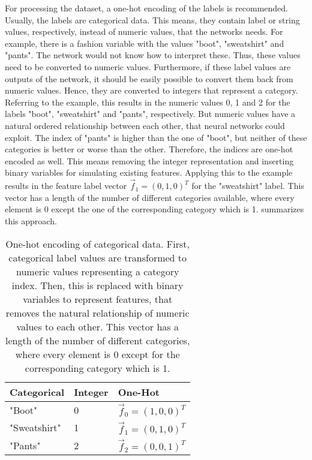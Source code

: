 For processing the dataset, a one-hot encoding\cite{Harris2012} of the labels is recommended.
Usually, the labels are categorical data.
This means, they contain label or string values, respectively, instead of numeric values, that the networks needs.
For example, there is a fashion variable with the values "boot", "sweatshirt" and "pants".
The network would not know how to interpret these.
Thus, these values need to be converted to numeric values.
Furthermore, if these label values are outputs of the network, it should be easily possible to convert them back from numeric values.
Hence, they are converted to integers that represent a category.
Referring to the example, this results in the numeric values 0, 1 and 2 for the labels "boot", "sweatshirt" and "pants", respectively.
But numeric values have a natural ordered relationship between each other, that neural networks could exploit.
The index of "pants" is higher than the one of "boot", but neither of these categories is better or worse than the other.
Therefore, the indices are one-hot encoded as well.
This means removing the integer representation and inserting binary variables for simulating existing features.
Applying this to the example results in the feature label vector $\vec{f}_1 = (0, 1, 0)^T$ for the "sweatshirt" label.
This vector has a length of the number of different categories available, where every element is 0 except the one of the corresponding category which is 1.
 summarizes this approach.
\begin{table}[]
	\caption[One-Hot Encoding of Categorical Data]{One-hot encoding of categorical data. First, categorical label values are transformed to numeric values representing a category index. Then, this is replaced with binary variables to represent features, that removes the natural relationship of numeric values to each other. This vector has a length of the number of different categories, where every element is 0 except for the corresponding category which is 1.}
	\label{tab:one-hot-encoding}
	\centering
	\begin{tabular}{l|l|l}
		Categorical   & Integer & One-Hot                   \\ \hline
		"Boot"       & 0       & $\vec{f}_0 = (1, 0, 0)^T$ \\
		"Sweatshirt" & 1       & $\vec{f}_1 = (0,1, 0)^T$  \\
		"Pants"      & 2       & $\vec{f}_2 = (0, 0, 1)^T$
	\end{tabular}
\end{table}